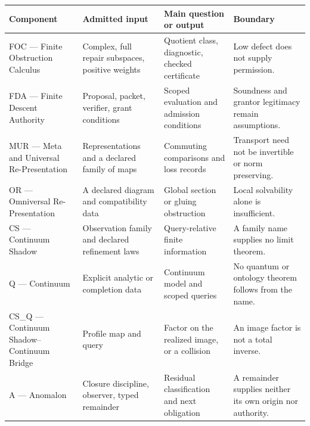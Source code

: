 \documentclass[
  11pt,
]{article}
\begin{document}
\begin{longtable}[]{@{}
  >{\raggedright\arraybackslash}p{}
  >{\raggedright\arraybackslash}p{}
  >{\raggedright\arraybackslash}p{}
  >{\raggedright\arraybackslash}p{}@{}}
\toprule\noalign{}
\begin{minipage}[b]{\linewidth}\raggedright
Component
\end{minipage} & \begin{minipage}[b]{\linewidth}\raggedright
Admitted input
\end{minipage} & \begin{minipage}[b]{\linewidth}\raggedright
Main question or output
\end{minipage} & \begin{minipage}[b]{\linewidth}\raggedright
Boundary
\end{minipage} \\
\midrule\noalign{}
\endhead
\bottomrule\noalign{}
\endlastfoot
FOC --- Finite Obstruction Calculus & Complex, full repair subspaces, positive weights & Quotient class, diagnostic, checked certificate & Low defect does not supply permission. \\
FDA --- Finite Descent Authority & Proposal, packet, verifier, grant conditions & Scoped evaluation and admission conditions & Soundness and grantor legitimacy remain assumptions. \\
MUR --- Meta and Universal Re-Presentation & Representations and a declared family of maps & Commuting comparisons and loss records & Transport need not be invertible or norm preserving. \\
OR --- Omniversal Re-Presentation & A declared diagram and compatibility data & Global section or gluing obstruction & Local solvability alone is insufficient. \\
CS --- Continuum Shadow & Observation family and declared refinement laws & Query-relative finite information & A family name supplies no limit theorem. \\
Q --- Continuum & Explicit analytic or completion data & Continuum model and scoped queries & No quantum or ontology theorem follows from the name. \\
CS\_Q --- Continuum Shadow--Continuum Bridge & Profile map and query & Factor on the realized image, or a collision & An image factor is not a total inverse. \\
A --- Anomalon & Closure discipline, observer, typed remainder & Residual classification and next obligation & A remainder supplies neither its own origin nor authority. \\
\end{longtable}
\end{document}
